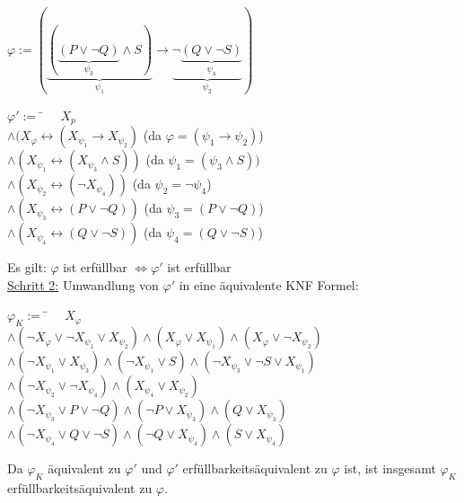 \documentclass[a4paper,10pt]{article}
\begin{document}
	$ \varphi := (\underbrace{(\underbrace{(P\vee \lnot Q)}_{\psi_3}\wedge S)}_{\psi_1} \rightarrow \underbrace{\lnot \underbrace{(Q \vee \lnot S)}_{\psi_4}}_{\psi_2}) $ \\
	\begin{tabbing}
		$ \varphi' :=$ 
		\= $ \quad X_p $ \qquad \qquad \qquad \qquad \qquad \qquad \qquad \= \\
		\> $ \wedge (X_\varphi \leftrightarrow (X_{\psi_1}\rightarrow X_{\psi_2})$ \> (da $ \varphi = (\psi_1 \rightarrow \psi_2) $) \\
		\> $ \wedge (X_{\psi_1} \leftrightarrow (X_{\psi_3} \wedge S)) $ \> (da $ \psi_1 = (\psi_3 \wedge S)) $ \\
		\> $ \wedge (X_{\psi_2} \leftrightarrow (\lnot X_{\psi_4})) $ \> (da $ \psi_2 = \lnot \psi_4 $) \\
		\> $ \wedge (X_{\psi_3} \leftrightarrow (P \vee \lnot Q)) $ \> (da $ \psi_3 = (P \vee \lnot Q) $) \\
		\> $ \wedge (X_{\psi_4} \leftrightarrow (Q \vee \lnot S)) $ \> (da $ \psi_4 = (Q \vee \lnot S) $)
	\end{tabbing}
	Es gilt: $ \varphi $ ist erfüllbar $ \Longleftrightarrow  \varphi' $ ist erfüllbar \\
	\newpage
	\underline{Schritt 2:} Umwandlung von $ \varphi' $ in eine äquivalente KNF Formel: \\
	\begin{tabbing}
		$ \varphi_K := $
		\= $ \quad X_\varphi $ \\
		\> $ \wedge (\lnot X_\varphi \vee \lnot X_{\psi_1} \vee X_{\psi_2}) \wedge (X_\varphi \vee X_{\psi_1}) \wedge (X_\varphi \vee \lnot X_{\psi_2}) $ \\
		\> $ \wedge (\lnot X_{\psi_1} \vee X_{\psi_3}) \wedge (\lnot X_{\psi_1} \vee S) \wedge (\lnot X_{\psi_3} \vee \lnot S \vee X_{\psi_1}) $ \\
		\> $ \wedge (\lnot X_{\psi_2} \vee \lnot X_{\psi_4}) \wedge (X_{\psi_4} \vee X_{\psi_2}) $ \\
		\> $ \wedge (\lnot X_{\psi_3} \vee P \vee \lnot Q) \wedge (\lnot P \vee X_{\psi_3}) \wedge (Q \vee X_{\psi_3}) $ \\
		\> $ \wedge (\lnot X_{\psi_4} \vee Q \vee \lnot S) \wedge (\lnot Q \vee X_{\psi_4}) \wedge (S \vee X_{\psi_4}) $
	\end{tabbing}
	Da $ \varphi_K $ äquivalent zu $ \varphi' $ und $ \varphi' $ erfüllbarkeitsäquivalent zu $ \varphi $ ist, ist insgesamt $ \varphi_K $ erfüllbarkeitsäquivalent zu $ \varphi $.
\end{document}
